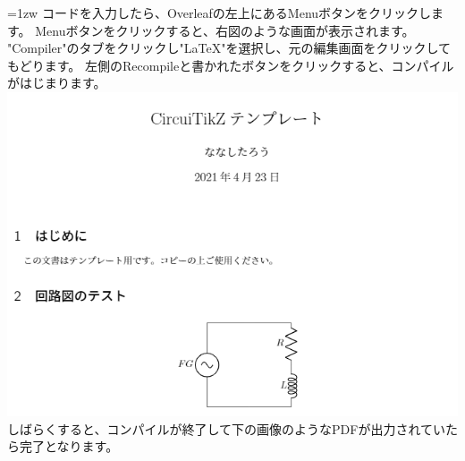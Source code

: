 			\noindent
			\begin{minipage}{0.65\hsize}\parindent=1zw
				コードを入力したら、Overleafの左上にあるMenuボタンをクリックします。
				Menuボタンをクリックすると、右図のような画面が表示されます。
				"Compiler"のタブをクリックし"LaTeX"を選択し、元の編集画面をクリックしてもどります。
				左側のRecompileと書かれたボタンをクリックすると、コンパイルがはじまります。
				\includegraphics[width=\textwidth]{overleaf-example-pdf.png}
				しばらくすると、コンパイルが終了して下の画像のようなPDFが出力されていたら完了となります。
			\end{minipage}\hfill
